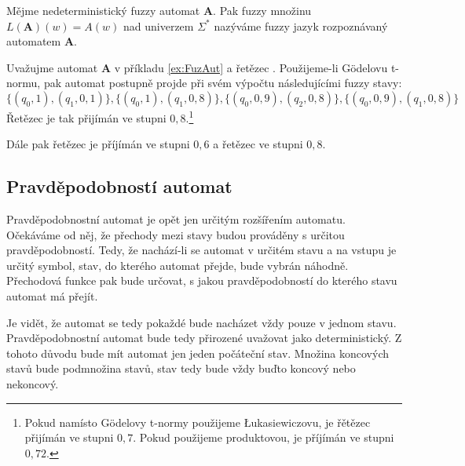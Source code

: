\documentclass[a4paper,10pt]{article}
\begin{document}
\begin{definition}\label{def-JazRozpAut}
 Mějme nedeterministický fuzzy automat $\mathbf{A}$. Pak fuzzy množinu $L(\mathbf{A})(w) = A(w)$ nad univerzem $\Sigma^*$ nazýváme fuzzy jazyk rozpoznávaný automatem $\mathbf{A}$.
\end{definition}

\begin{example}
 Uvažujme automat $\mathbf{A}$ v příkladu \ref{ex:FuzAut} a řetězec . Použijeme-li Gödelovu t-normu, pak automat postupně projde při svém výpočtu následujícími fuzzy stavy:
 $$
  \{ (q_0, 1), 		(q_1, 0{,}1) 	 		\}, 
  \{ (q_0, 1), 		(q_1, 0{,}8) 	 		\}, 
  \{ (q_0, 0{,}9), 		 	(q_2, 0{,}8) 	\}, 
  \{ (q_0, 0{,}9), 	(q_1, 0{,}8) 		 	\}
 $$
 Řetězec je tak přijímán ve stupni $0{,}8$.\footnote{Pokud namísto Gödelovy t-normy použijeme \L{}ukasiewiczovu, je řětězec přijímán ve stupni $0,7$. Pokud použijeme produktovou, je příjímán ve stupni $0{,}72$.}
 
 Dále pak řetězec  je příjímán ve stupni $0{,}6$ a řetězec  ve stupni $0{,}8$.
\end{example}


\subsection{Pravděpodobností automat}

Pravděpodobnostní automat je opět jen určitým rozšířením  automatu. Očekáváme od něj, že přechody mezi stavy budou prováděny s určitou pravděpodobností. Tedy, že nachází-li se automat v určitém stavu a na vstupu je určitý symbol, stav, do kterého automat přejde, bude vybrán náhodně. Přechodová funkce pak bude určovat, s jakou pravděpodobností do kterého stavu automat má přejít.

Je vidět, že automat se tedy pokaždé bude nacházet vždy pouze v jednom stavu. Pravděpodobnostní automat bude tedy přirozené uvažovat jako deterministický. Z tohoto důvodu bude mít automat jen jeden počáteční stav. Množina koncových stavů bude  podmnožina stavů, stav tedy bude vždy buďto koncový nebo nekoncový.
\end{document}

